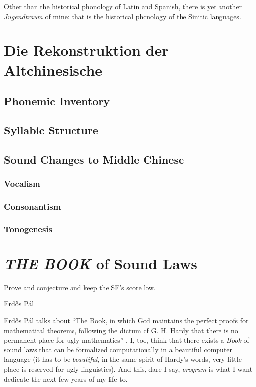 \documentclass{report}[12pt]
\begin{document}
Other than the historical phonology of Latin and Spanish, there is yet another \emph{Jugendtraum} of mine: that is the historical phonology of the Sinitic languages.

\section{Die Rekonstruktion der Altchinesische}

\subsection{Phonemic Inventory}

\subsection{Syllabic Structure}

\subsection{Sound Changes to Middle Chinese}

\subsubsection{Vocalism}

\subsubsection{Consonantism}

\subsubsection{Tonogenesis}

\section{\emph{THE BOOK} of Sound Laws}

\epigraph{Prove and conjecture and keep the SF's score low.\footnotemark}{Erd\H{o}s P\'{a}l}

Erd\H{o}s P\'{a}l talks about ``The Book, in which God maintains the perfect proofs for mathematical theorems, following the dictum of G. H. Hardy that there is no permanent place for ugly mathematics'' \parencite[p.~5]{proofs_from_the_book}. I, too, think that there exists a \emph{Book} of sound laws that can be formalized computationally in a beautiful computer language (it has to be \emph{beautiful}, in the same spirit of Hardy's words, very little place is reserved for ugly linguistics). And this, dare I say, \emph{program} is what I want dedicate the next few years of my life to. \\
\end{document}
